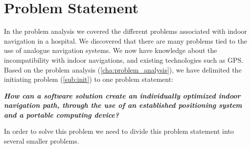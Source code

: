 \chapter{Problem Statement}



In the problem analysis we covered the different problems associated with indoor navigation in a hospital.
We discovered that there are many problems tied to the use of analogue navigation systems. We now have knowledge about the incompatibility with indoor navigations, and existing technologies such as GPS.
Based on the problem analysis (\cref{cha:problem_analysis}), we have delimited the initiating problem (\cref{sub:init}) to one problem statement:

\textit{\textbf{How can a software solution create an individually optimized indoor navigation path, through the use of an established positioning system and a portable computing device?}}

In order to solve this problem we need to divide this problem statement into several smaller problems.







